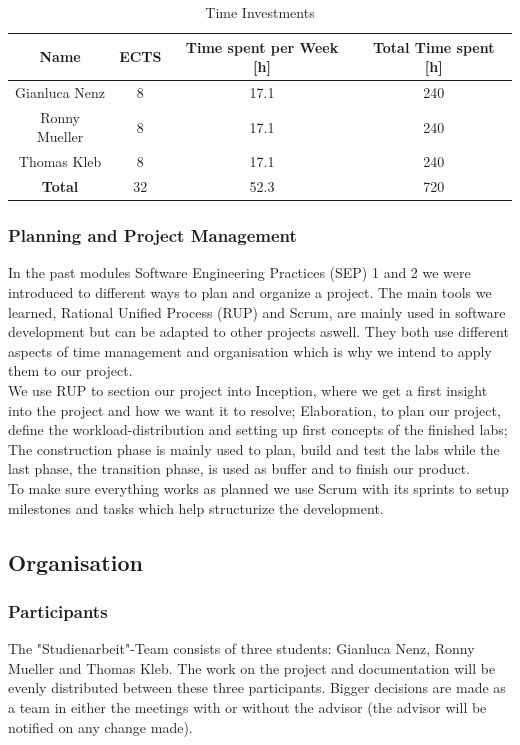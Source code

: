 \begin{table}
    \centering
    \begin{tabular}{||c c c c||} 
        \hline
        Name & ECTS & Time spent per Week [h] & Total Time spent [h]\\ [0.5ex] 
        \hline\hline
        Gianluca Nenz & 8 & 17.1 & 240 \\ 
        \hline
        Ronny Mueller & 8 & 17.1 & 240 \\
        \hline
        Thomas Kleb & 8 & 17.1 & 240 \\ 
        \hline
        \textbf{Total} & 32 & 52.3 & 720 \\[1ex] 
        \hline
    \end{tabular}
    \caption{Time Investments}
    \label{time_ects}
\end{table}

\subsubsection*{Planning and Project Management}
In the past modules Software Engineering Practices (SEP) 1 and 2  we were introduced to different ways to plan and organize a project. The main tools we learned, Rational Unified Process (RUP) and Scrum, are mainly used in software development but can be adapted to other projects aswell. They both use different aspects of time management and organisation which is why we intend to apply them to our project. \\
We use RUP to section our project into Inception, where we get a first insight into the project and how we want it to resolve; Elaboration, to plan our project, define the workload-distribution and setting up first concepts of the finished labs; The construction phase is mainly used to plan, build and test the labs while the last phase, the transition phase, is used as buffer and to finish our product. \\ 
To make sure everything works as planned we use Scrum with its sprints to setup milestones and tasks which help structurize the development. 

\subsection{Organisation}

\subsubsection*{Participants}
The "Studienarbeit"-Team consists of three students: Gianluca Nenz, Ronny Muel\-ler and Thomas Kleb. The work on the project and documentation will be evenly distributed between these three participants. Bigger decisions are made as a team in either the meetings with or without the advisor (the advisor will be notified on any change made).

